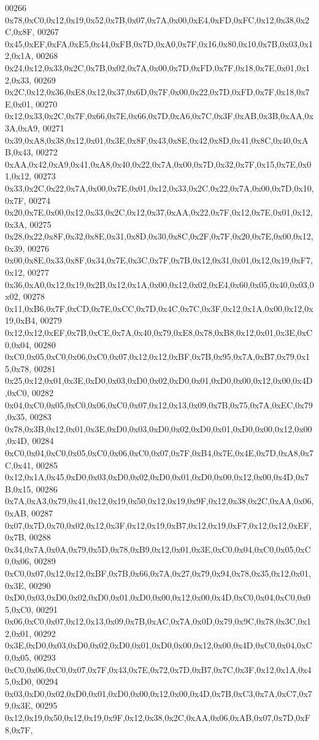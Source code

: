 \begin{DoxyCode}
00266 0x78,0xC0,0x12,0x19,0x52,0x7B,0x07,0x7A,0x00,0xE4,0xFD,0xFC,0x12,0x38,0x2C,0x8F,
00267 0x45,0xEF,0xFA,0xE5,0x44,0xFB,0x7D,0xA0,0x7F,0x16,0x80,0x10,0x7B,0x03,0x12,0x1A,
00268 0x24,0x12,0x33,0x2C,0x7B,0x02,0x7A,0x00,0x7D,0xFD,0x7F,0x18,0x7E,0x01,0x12,0x33,
00269 0x2C,0x12,0x36,0xE8,0x12,0x37,0x6D,0x7F,0x00,0x22,0x7D,0xFD,0x7F,0x18,0x7E,0x01,
00270 0x12,0x33,0x2C,0x7F,0x66,0x7E,0x66,0x7D,0xA6,0x7C,0x3F,0xAB,0x3B,0xAA,0x3A,0xA9,
00271 0x39,0xA8,0x38,0x12,0x01,0x3E,0x8F,0x43,0x8E,0x42,0x8D,0x41,0x8C,0x40,0xAB,0x43,
00272 0xAA,0x42,0xA9,0x41,0xA8,0x40,0x22,0x7A,0x00,0x7D,0x32,0x7F,0x15,0x7E,0x01,0x12,
00273 0x33,0x2C,0x22,0x7A,0x00,0x7E,0x01,0x12,0x33,0x2C,0x22,0x7A,0x00,0x7D,0x10,0x7F,
00274 0x20,0x7E,0x00,0x12,0x33,0x2C,0x12,0x37,0xAA,0x22,0x7F,0x12,0x7E,0x01,0x12,0x3A,
00275 0x28,0x22,0x8F,0x32,0x8E,0x31,0x8D,0x30,0x8C,0x2F,0x7F,0x20,0x7E,0x00,0x12,0x39,
00276 0x00,0x8E,0x33,0x8F,0x34,0x7E,0x3C,0x7F,0x7B,0x12,0x31,0x01,0x12,0x19,0xF7,0x12,
00277 0x36,0xA0,0x12,0x19,0x2B,0x12,0x1A,0x00,0x12,0x02,0xE4,0x60,0x05,0x40,0x03,0x02,
00278 0x11,0xB6,0x7F,0xCD,0x7E,0xCC,0x7D,0x4C,0x7C,0x3F,0x12,0x1A,0x00,0x12,0x19,0xB4,
00279 0x12,0x12,0xEF,0x7B,0xCE,0x7A,0x40,0x79,0xE8,0x78,0xB8,0x12,0x01,0x3E,0xC0,0x04,
00280 0xC0,0x05,0xC0,0x06,0xC0,0x07,0x12,0x12,0xBF,0x7B,0x95,0x7A,0xB7,0x79,0x15,0x78,
00281 0x25,0x12,0x01,0x3E,0xD0,0x03,0xD0,0x02,0xD0,0x01,0xD0,0x00,0x12,0x00,0x4D,0xC0,
00282 0x04,0xC0,0x05,0xC0,0x06,0xC0,0x07,0x12,0x13,0x09,0x7B,0x75,0x7A,0xEC,0x79,0x35,
00283 0x78,0x3B,0x12,0x01,0x3E,0xD0,0x03,0xD0,0x02,0xD0,0x01,0xD0,0x00,0x12,0x00,0x4D,
00284 0xC0,0x04,0xC0,0x05,0xC0,0x06,0xC0,0x07,0x7F,0xB4,0x7E,0x4E,0x7D,0xA8,0x7C,0x41,
00285 0x12,0x1A,0x45,0xD0,0x03,0xD0,0x02,0xD0,0x01,0xD0,0x00,0x12,0x00,0x4D,0x7B,0x15,
00286 0x7A,0xA3,0x79,0x41,0x12,0x19,0x50,0x12,0x19,0x9F,0x12,0x38,0x2C,0xAA,0x06,0xAB,
00287 0x07,0x7D,0x70,0x02,0x12,0x3F,0x12,0x19,0xB7,0x12,0x19,0xF7,0x12,0x12,0xEF,0x7B,
00288 0x34,0x7A,0x0A,0x79,0x5D,0x78,0xB9,0x12,0x01,0x3E,0xC0,0x04,0xC0,0x05,0xC0,0x06,
00289 0xC0,0x07,0x12,0x12,0xBF,0x7B,0x66,0x7A,0x27,0x79,0x94,0x78,0x35,0x12,0x01,0x3E,
00290 0xD0,0x03,0xD0,0x02,0xD0,0x01,0xD0,0x00,0x12,0x00,0x4D,0xC0,0x04,0xC0,0x05,0xC0,
00291 0x06,0xC0,0x07,0x12,0x13,0x09,0x7B,0xAC,0x7A,0x0D,0x79,0x9C,0x78,0x3C,0x12,0x01,
00292 0x3E,0xD0,0x03,0xD0,0x02,0xD0,0x01,0xD0,0x00,0x12,0x00,0x4D,0xC0,0x04,0xC0,0x05,
00293 0xC0,0x06,0xC0,0x07,0x7F,0x43,0x7E,0x72,0x7D,0xB7,0x7C,0x3F,0x12,0x1A,0x45,0xD0,
00294 0x03,0xD0,0x02,0xD0,0x01,0xD0,0x00,0x12,0x00,0x4D,0x7B,0xC3,0x7A,0xC7,0x79,0x3E,
00295 0x12,0x19,0x50,0x12,0x19,0x9F,0x12,0x38,0x2C,0xAA,0x06,0xAB,0x07,0x7D,0xF8,0x7F,

\end{DoxyCode}
